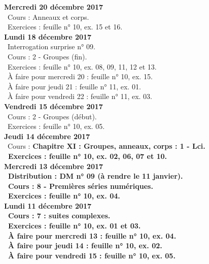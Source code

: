 \documentclass[12pt,a4paper]{article}
\begin{document}
\noindent\textbf{\bf Mercredi 20 décembre 2017}\\
\bu\ Cours : Anneaux et corps.\\ 
\bu\ Exercices : feuille n° 10, ex. 15 et 16.\vspace{.4cm}\\

\noindent\textbf{Lundi 18 décembre 2017}\\
\bu\ Interrogation surprise n° 09.\\
\bu\ Cours : 2 - Groupes (fin).\\ 
\bu\ Exercices : feuille n° 10, ex. 08, 09, 11, 12 et 13.\\
\bu\ À faire pour mercredi 20 : feuille n° 10, ex. 15.\\
\bu\ À faire pour jeudi 21 : feuille n° 11, ex. 01.\\
\bu\ À faire pour vendredi 22 : feuille n° 11, ex. 03.\vspace{.4cm}\\

\noindent\textbf{Vendredi 15 décembre 2017}\\
\bu\ Cours : 2 - Groupes (début).\\ 
\bu\ Exercices : feuille n° 10, ex. 05.\vspace{.4cm}\\

\noindent\textbf{Jeudi 14 décembre 2017}\\
\bu\ Cours : \bf Chapitre XI \rm : Groupes, anneaux, corps  : 1 - Lci.\\
\bu\ Exercices : feuille n° 10, ex. 02, 06, 07 et 10.\vspace{.4cm}\\

\noindent\textbf{\bf Mercredi 13 décembre 2017}\\
\bu\ Distribution : DM n° 09 (à rendre le 11 janvier).\\
\bu\ Cours : 8 - Premières séries numériques.\\
\bu\ Exercices : feuille n° 10, ex. 04.\vspace{.4cm}\\

\noindent\textbf{Lundi 11 décembre 2017}\\
\bu\ Cours : 7 : suites complexes.\\
\bu\ Exercices : feuille n° 10, ex. 01 et 03.\\
\bu\ À faire pour mercredi 13 : feuille n° 10, ex. 04.\\
\bu\ À faire pour jeudi 14 : feuille n° 10, ex. 02.\\
\bu\ À faire pour vendredi 15 : feuille n° 10, ex. 05.\vspace{.4cm}\\
\end{document}
